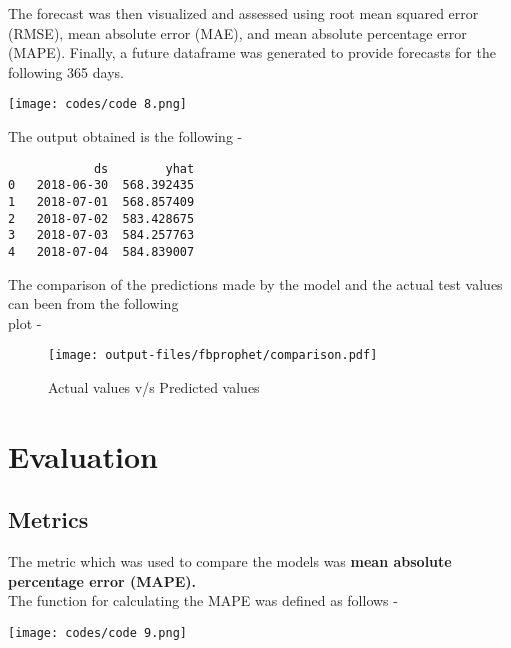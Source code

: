 \documentclass[12pt]{article}
\begin{document}
\noindent The forecast was then visualized and assessed using root mean squared error (RMSE), mean absolute error (MAE), and mean absolute percentage error (MAPE). Finally, a future dataframe was generated to provide forecasts for the following 365 days.
\begin{center}
    \texttt{[image: codes/code 8.png]}
\end{center}
The output obtained is the following - \\
\begin{center}
\begin{varwidth}{\linewidth}
\begin{verbatim}
            ds        yhat
0   2018-06-30  568.392435
1   2018-07-01  568.857409
2   2018-07-02  583.428675
3   2018-07-03  584.257763
4   2018-07-04  584.839007

\end{verbatim}
\end{varwidth}
\end{center}
\pagebreak
\noindent The comparison of the predictions made by the model and the actual test values can been from the following \\plot -
\begin{figure}[H]
    \centering
    \texttt{[image: output-files/fbprophet/comparison.pdf]}
    \caption{Actual values v/s Predicted values}
    \label{fig:enter-label}
\end{figure}
\section{Evaluation}
\subsection{Metrics}
The metric which was used to compare the models was \textbf{mean absolute percentage error (MAPE).}\\ {The function for calculating the MAPE was defined as follows - }
\begin{center}
    \texttt{[image: codes/code 9.png]}
\end{center}
\end{document}
